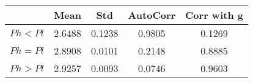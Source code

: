 \begin{tiny}\begin{tabular}{|l|c|c|c|c|}
\hline
&\textbf{Mean}&\textbf{Std}&\textbf{AutoCorr}&\textbf{Corr with g}\\\hline
\textbf{$Ph<Pl$}&2.6488&0.1238&0.9805&0.1269\\\hline
\textbf{$Ph=Pl$}&2.8908&0.0101&0.2148&0.8885\\\hline
\textbf{$Ph>Pl$}&2.9257&0.0093&0.0746&0.9603\\\hline
\end{tabular}
\end{tiny}